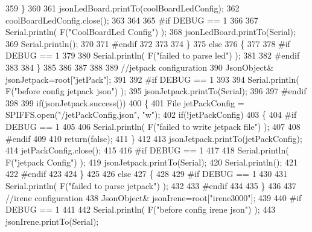 \begin{DoxyCode}
359         \}
360         
361         jsonLedBoard.printTo(coolBoardLedConfig);
362         coolBoardLedConfig.close();
363 
364 
365 \textcolor{preprocessor}{    #if DEBUG == 1 }
366 
367         Serial.println( F(\textcolor{stringliteral}{"CoolBoardLed Config"}) );     
368         jsonLedBoard.printTo(Serial);
369         Serial.println();
370     
371 \textcolor{preprocessor}{    #endif}
372 
373     
374     \}
375     \textcolor{keywordflow}{else}
376     \{
377     
378 \textcolor{preprocessor}{    #if DEBUG == 1 }
379 
380         Serial.println( F(\textcolor{stringliteral}{"failed to parse led"}) );
381     
382 \textcolor{preprocessor}{    #endif }
383 
384     \}
385         
386 
387     
388 
389     \textcolor{comment}{//jetpack configuration}
390         JsonObject& jsonJetpack=root[\textcolor{stringliteral}{"jetPack"}];
391 
392 \textcolor{preprocessor}{#if DEBUG == 1 }
393 
394     Serial.println( F(\textcolor{stringliteral}{"before config jetpack json"}) );
395     jsonJetpack.printTo(Serial);
396 
397 \textcolor{preprocessor}{#endif}
398 
399     \textcolor{keywordflow}{if}(jsonJetpack.success())
400     \{   
401         File jetPackConfig = SPIFFS.open(\textcolor{stringliteral}{"/jetPackConfig.json"}, \textcolor{stringliteral}{"w"});   
402         \textcolor{keywordflow}{if}(!jetPackConfig)
403         \{
404 \textcolor{preprocessor}{        #if DEBUG == 1}
405 
406             Serial.println( F(\textcolor{stringliteral}{"failed to write jetpack file"}) );
407         
408 \textcolor{preprocessor}{        #endif}
409 
410             \textcolor{keywordflow}{return}(\textcolor{keyword}{false});
411         \}
412 
413         jsonJetpack.printTo(jetPackConfig);
414         jetPackConfig.close();
415 
416 \textcolor{preprocessor}{    #if DEBUG == 1}
417 
418         Serial.println( F(\textcolor{stringliteral}{"jetpack Config"}) );  
419         jsonJetpack.printTo(Serial);
420         Serial.println();
421     
422 \textcolor{preprocessor}{    #endif}
423 
424     \}
425 
426     \textcolor{keywordflow}{else}
427     \{
428     
429 \textcolor{preprocessor}{    #if DEBUG == 1 }
430 
431         Serial.println( F(\textcolor{stringliteral}{"failed to parse jetpack"}) ); 
432     
433 \textcolor{preprocessor}{    #endif}
434 
435     \}
436     
437     \textcolor{comment}{//irene configuration   }
438         JsonObject& jsonIrene=root[\textcolor{stringliteral}{"irene3000"}];
439     
440 \textcolor{preprocessor}{#if DEBUG == 1 }
441 
442     Serial.println( F(\textcolor{stringliteral}{"before config irene json"}) );    
443     jsonIrene.printTo(Serial);

\end{DoxyCode}
